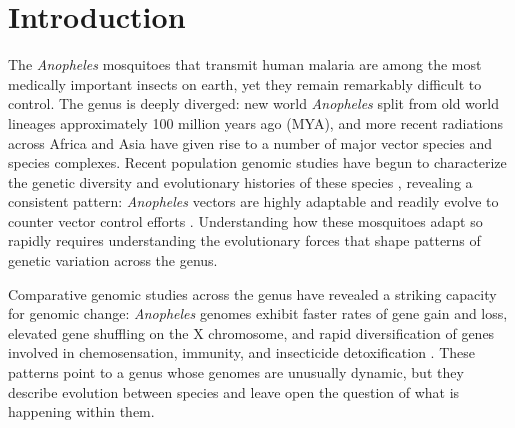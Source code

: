 
\section{Introduction}

The \textit{Anopheles} mosquitoes that transmit human malaria
are among the most medically important insects on earth,
yet they remain remarkably difficult to control.
The genus is deeply diverged:
new world \textit{Anopheles} split from old world lineages
approximately 100 million years ago (MYA),
and more recent radiations across Africa and Asia
have given rise to a number of major vector species
and species complexes.
Recent population genomic studies have begun to characterize
the genetic diversity and evolutionary histories of these species
\citep{anopheles_comparative, darlingi, funestus, gambiae, minimus},
revealing a consistent pattern:
\textit{Anopheles} vectors are highly adaptable
and readily evolve to counter vector control efforts
\citep{gambiae, funestus}.
Understanding how these mosquitoes adapt so rapidly requires understanding
the evolutionary forces that shape patterns of genetic variation
across the genus.

Comparative genomic studies across the genus have revealed a striking capacity for genomic change:
\textit{Anopheles} genomes exhibit faster rates of gene gain and loss,
elevated gene shuffling on the X chromosome,
and rapid diversification of genes involved in chemosensation,
immunity, and insecticide detoxification \citep{anopheles_comparative}.
These patterns point to a genus whose genomes are unusually dynamic,
but they describe evolution between species
and leave open the question of what is happening within them.

